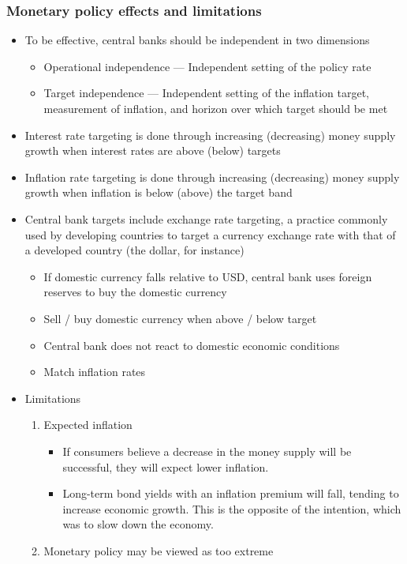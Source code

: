 \documentclass[../notes_compiled.tex]{subfiles}
\begin{document}
\subsubsection{Monetary policy effects and limitations}
\begin{itemize}
\item To be effective, central banks should be independent in two dimensions
\begin{itemize}
\item Operational independence --- Independent setting of the policy rate
\item Target independence --- Independent setting of the inflation target, measurement of inflation, and horizon over which target should be met
\end{itemize}
\item Interest rate targeting is done through increasing (decreasing) money supply growth when interest rates are above (below) targets
\item Inflation rate targeting is done through increasing (decreasing) money supply growth when inflation is below (above) the target band
\item Central bank targets include exchange rate targeting, a practice commonly used by developing countries to target a currency exchange rate with that of a developed country (the dollar, for instance)
\begin{itemize}
\item If domestic currency falls relative to USD, central bank uses foreign reserves to buy the domestic currency
\item Sell / buy domestic currency when above / below target
\item Central bank does not react to domestic economic conditions
\item Match inflation rates
\end{itemize}
\item Limitations
\begin{enumerate}
\item Expected inflation
\begin{itemize}
\item If consumers believe a decrease in the money supply will be successful, they will expect lower inflation.
\item Long-term bond yields with an inflation premium will fall, tending to increase economic growth. This is the opposite of the intention, which was to slow down the economy.
\end{itemize}
\item Monetary policy may be viewed as too extreme

\end{enumerate}
\end{itemize}
\end{document}
